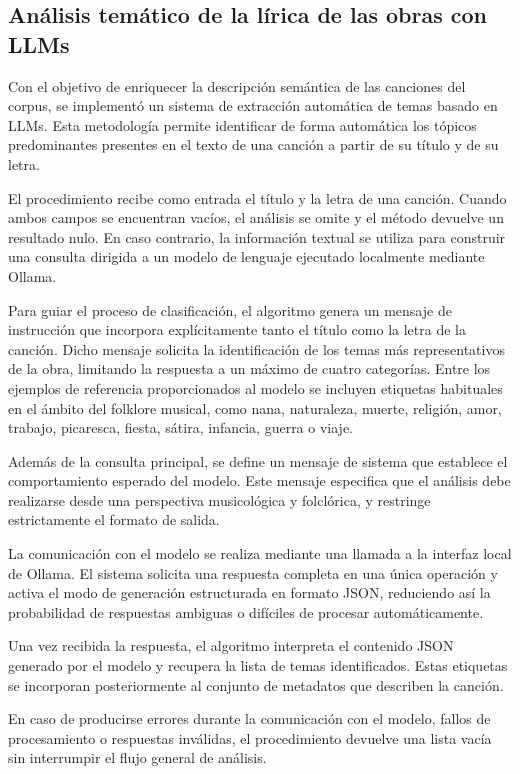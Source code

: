 \subsection{Análisis temático de la lírica de las obras con LLMs}
Con el objetivo de enriquecer la descripción semántica de las canciones del corpus, se implementó un sistema de extracción automática de temas basado en LLMs. Esta metodología permite identificar de forma automática los tópicos predominantes presentes en el texto de una canción a partir de su título y de su letra.

El procedimiento recibe como entrada el título y la letra de una canción. Cuando ambos campos se encuentran vacíos, el análisis se omite y el método devuelve un resultado nulo. En caso contrario, la información textual se utiliza para construir una consulta dirigida a un modelo de lenguaje ejecutado localmente mediante Ollama.

Para guiar el proceso de clasificación, el algoritmo genera un mensaje de instrucción que incorpora explícitamente tanto el título como la letra de la canción. Dicho mensaje solicita la identificación de los temas más representativos de la obra, limitando la respuesta a un máximo de cuatro categorías. Entre los ejemplos de referencia proporcionados al modelo se incluyen etiquetas habituales en el ámbito del folklore musical, como nana, naturaleza, muerte, religión, amor, trabajo, picaresca, fiesta, sátira, infancia, guerra o viaje.

Además de la consulta principal, se define un mensaje de sistema que establece el comportamiento esperado del modelo. Este mensaje especifica que el análisis debe realizarse desde una perspectiva musicológica y folclórica, y restringe estrictamente el formato de salida.

La comunicación con el modelo se realiza mediante una llamada a la interfaz local de Ollama. El sistema solicita una respuesta completa en una única operación y activa el modo de generación estructurada en formato JSON, reduciendo así la probabilidad de respuestas ambiguas o difíciles de procesar automáticamente.

Una vez recibida la respuesta, el algoritmo interpreta el contenido JSON generado por el modelo y recupera la lista de temas identificados. Estas etiquetas se incorporan posteriormente al conjunto de metadatos que describen la canción.

En caso de producirse errores durante la comunicación con el modelo, fallos de procesamiento o respuestas inválidas, el procedimiento devuelve una lista vacía sin interrumpir el flujo general de análisis.

